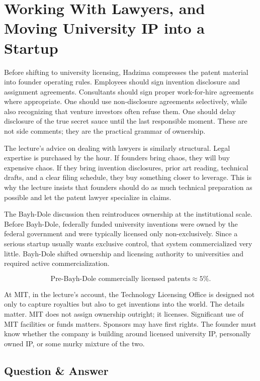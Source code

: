 \section{Working With Lawyers, and Moving University IP into a Startup}

Before shifting to university licensing, Hadzima compresses the patent material into founder operating rules. Employees should sign invention disclosure and assignment agreements. Consultants should sign proper work-for-hire agreements where appropriate. One should use non-disclosure agreements selectively, while also recognizing that venture investors often refuse them. One should delay disclosure of the true secret sauce until the last responsible moment. These are not side comments; they are the practical grammar of ownership.

The lecture's advice on dealing with lawyers is similarly structural. Legal expertise is purchased by the hour. If founders bring chaos, they will buy expensive chaos. If they bring invention disclosures, prior art reading, technical drafts, and a clear filing schedule, they buy something closer to leverage. This is why the lecture insists that founders should do as much technical preparation as possible and let the patent lawyer specialize in claims.

The Bayh-Dole discussion then reintroduces ownership at the institutional scale. Before Bayh-Dole, federally funded university inventions were owned by the federal government and were typically licensed only non-exclusively. Since a serious startup usually wants exclusive control, that system commercialized very little. Bayh-Dole shifted ownership and licensing authority to universities and required active commercialization.

\begin{equation}
\text{Pre-Bayh-Dole commercially licensed patents} \approx 5\%.
\end{equation}

At MIT, in the lecture's account, the Technology Licensing Office is designed not only to capture royalties but also to get inventions into the world. The details matter. MIT does not assign ownership outright; it licenses. Significant use of MIT facilities or funds matters. Sponsors may have first rights. The founder must know whether the company is building around licensed university IP, personally owned IP, or some murky mixture of the two.

\subsection{Question \& Answer}

